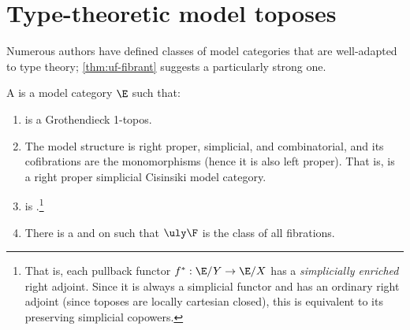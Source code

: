 \section{Type-theoretic model toposes}
\label{sec:ttmt}

Numerous authors have defined classes of model categories that are well-adapted to type theory; \cref{thm:uf-fibrant} suggests a particularly strong one.

\begin{defn}\label{defn:ttmt}
  A \textbf{\ttmt} is a model category $\E$ such that:
  \begin{enumerate}
  \item \E is a Grothendieck 1-topos.
  \item The model structure is right proper, %
    simplicial, and combinatorial, and its cofibrations are the monomorphisms (hence it is also left proper).
    That is, \E is a right proper simplicial Cisinsiki model category.
  \item \E is \slcc.\footnote{That is, each pullback functor $f^* :\E/Y \to \E/X$ has a \emph{simplicially enriched} right adjoint.
      Since it is always a simplicial functor and has an ordinary right adjoint (since toposes are locally cartesian closed), this is equivalent to its preserving simplicial copowers.}
  \item There is a \local and \stratified \nfs \F on \E such that $\uly\F$ is the class of all fibrations.
  \end{enumerate}
\end{defn}

